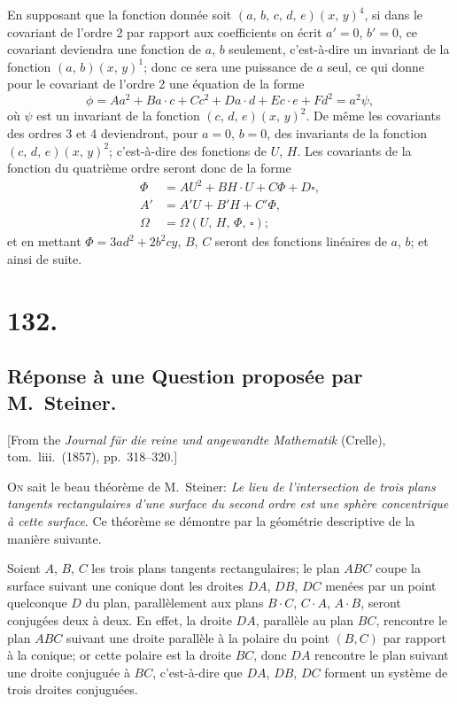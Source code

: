 \documentclass[11pt,a4paper]{book}
\begin{document}
En supposant que la fonction donn\'ee soit $(a,\, b,\, c,\, d,\, e)(x,\, y)^4$,
si dans le covariant de l'ordre 2 par rapport aux coefficients on \'ecrit
$a'=0$, $b'=0$, ce covariant deviendra une fonction de $a$, $b$ seulement,
c'est-\`a-dire un invariant de la fonction $(a,\, b)(x,\, y)^1$; donc ce sera
une puissance de $a$ seul, ce qui donne pour le covariant de l'ordre 2 une
\'equation de la forme
\[
\phi = Aa^2 + Ba\cdot c + Cc^2 + Da\cdot d + Ec\cdot e + Fd^2 = a^2 \psi,
\]
o\`u $\psi$ est un invariant de la fonction $(c,\, d,\, e)(x,\, y)^2$. De m\^eme
les covariants des ordres 3 et 4 deviendront, pour $a=0$, $b=0$, des
invariants de la fonction $(c,\, d,\, e)(x,\, y)^2$; c'est-\`a-dire des
fonctions de $U$, $H$. Les covariants de la fonction du quatri\`eme ordre
seront donc de la forme
\begin{align*}
\Phi &= AU^2 + BH\cdot U + C\Phi + D\square, \\
A' &= A'U + B'H + C'\Phi, \\
\Omega &= \Omega(U,\, H,\, \Phi,\, \square);
\end{align*}
et en mettant $\Phi = 3ad^2 + 2b^2cy$, $B$, $C$ seront des fonctions lin\'eaires
de $a$, $b$; et ainsi de suite.

\newpage
\section*{132.}
\subsection*{R\'eponse \`a une Question propos\'ee par M.~Steiner.}

[From the \textit{Journal f\"ur die reine und angewandte Mathematik} (Crelle),
tom.\ liii.\ (1857), pp.\ 318--320.]

\medskip

\textsc{On} sait le beau th\'eor\`eme de M.~Steiner: \textit{Le lieu de
l'intersection de trois plans tangents rectangulaires d'une surface du
second ordre est une sph\`ere concentrique \`a cette surface}. Ce th\'eor\`eme
se d\'emontre par la g\'eom\'etrie descriptive de la mani\`ere suivante.

Soient $A$, $B$, $C$ les trois plans tangents rectangulaires; le plan $ABC$
coupe la surface suivant une conique dont les droites $DA$, $DB$, $DC$
men\'ees par un point quelconque $D$ du plan, parall\`element aux plans
$B\!\cdot\!C$, $C\!\cdot\!A$, $A\!\cdot\!B$, seront conjug\'ees deux \`a deux. En effet,
la droite $DA$, parall\`ele au plan $BC$, rencontre le plan $ABC$ suivant
une droite parall\`ele \`a la polaire du point $(B,C)$ par rapport \`a la
conique; or cette polaire est la droite $BC$, donc $DA$ rencontre le plan
suivant une droite conjugu\'ee \`a $BC$, c'est-\`a-dire que $DA$, $DB$, $DC$
forment un syst\`eme de trois droites conjugu\'ees.
\end{document}
